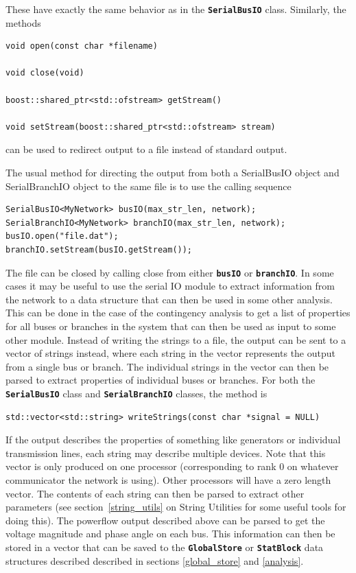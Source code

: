 These have exactly the same behavior as in the \texttt{\textbf{SerialBusIO}} class. Similarly, the methods

{
\color{red}
\begin{Verbatim}[fontseries=b]
void open(const char *filename)

void close(void)

boost::shared_ptr<std::ofstream> getStream()

void setStream(boost::shared_ptr<std::ofstream> stream)
\end{Verbatim}
}

can be used to redirect output to a file instead of standard output.

The usual method for directing the output from both a SerialBusIO object and SerialBranchIO object to the same file is to use the calling sequence

{
\color{red}
\begin{Verbatim}[fontseries=b]
SerialBusIO<MyNetwork> busIO(max_str_len, network);
SerialBranchIO<MyNetwork> branchIO(max_str_len, network);
busIO.open("file.dat");
branchIO.setStream(busIO.getStream());
\end{Verbatim}
}

The file can be closed by calling close from either \texttt{\textbf{busIO}} or \texttt{\textbf{branchIO}}.
In some cases it may be useful to use the serial IO module to extract information from the network to a data structure that can then be used in some other analysis. This can be done in the case of the contingency analysis to get a list of properties for all buses or branches in the system that can then be used as input to some other module. Instead of writing the strings to a file, the output can be sent to a vector of strings instead, where each string in the vector represents the output from a single bus or branch. The individual strings in the vector can then be parsed to extract properties of individual buses or branches. For both the \texttt{\textbf{SerialBusIO}} class and \texttt{\textbf{SerialBranchIO}} classes, the method is

{
\color{red}
\begin{Verbatim}[fontseries=b]
std::vector<std::string> writeStrings(const char *signal = NULL)
\end{Verbatim}
}

If the output describes the properties of something like generators or
individual transmission lines, each string may describe multiple devices. Note
that this vector is only produced on one processor (corresponding to rank 0 on
whatever communicator the network is using). Other processors will have a zero
length vector. The contents of each string can then be parsed to extract other
parameters (see section~\ref{string_utils} on String Utilities for some useful tools for doing
this). The powerflow output described above can be parsed to get the voltage
magnitude and phase angle on each bus. This information can then be stored in a
vector that can be saved to the \texttt{\textbf{GlobalStore}} or
\texttt{\textbf{StatBlock}} data structures described described in sections
\ref{global_store} and \ref{analysis}.
\newline
\hyperlink{topDoc}{\color{blue}{Top}}
